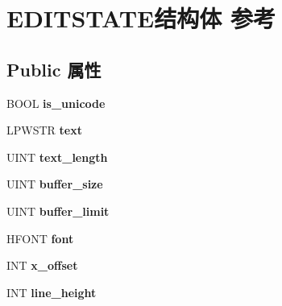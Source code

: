 \hypertarget{struct_e_d_i_t_s_t_a_t_e}{}\section{E\+D\+I\+T\+S\+T\+A\+T\+E结构体 参考}
\label{struct_e_d_i_t_s_t_a_t_e}
\subsection*{Public 属性}
\begin{DoxyCompactItemize}
\item 
\mbox{\label{struct_e_d_i_t_s_t_a_t_e_a9ad0f3fbecdb620628e9606bc6b0d281}} 
B\+O\+OL {\bfseries is\+\_\+unicode}
\item 
\mbox{\label{struct_e_d_i_t_s_t_a_t_e_a28a0fc200c80685fec5c30611979f70a}} 
L\+P\+W\+S\+TR {\bfseries text}
\item 
\mbox{\label{struct_e_d_i_t_s_t_a_t_e_a1a210bb22611295e32802b1051bf5e7e}} 
U\+I\+NT {\bfseries text\+\_\+length}
\item 
\mbox{\label{struct_e_d_i_t_s_t_a_t_e_ace8307276e1ef760902bdc68310f7a1b}} 
U\+I\+NT {\bfseries buffer\+\_\+size}
\item 
\mbox{\label{struct_e_d_i_t_s_t_a_t_e_a1931b9fd9de5e9b723c41b45e2b083ae}} 
U\+I\+NT {\bfseries buffer\+\_\+limit}
\item 
\mbox{\label{struct_e_d_i_t_s_t_a_t_e_a68ee90039532e91424bc48c1db952a8b}} 
H\+F\+O\+NT {\bfseries font}
\item 
\mbox{\label{struct_e_d_i_t_s_t_a_t_e_accf7e9831796bd83d0b99336c161cc44}} 
I\+NT {\bfseries x\+\_\+offset}
\item 
\mbox{\label{struct_e_d_i_t_s_t_a_t_e_ad705b982e62efc3681810042146bb36f}} 
I\+NT {\bfseries line\+\_\+height}
\item 
\mbox{\label{struct_e_d_i_t_s_t_a_t_e_a154bef13494fae871c3ee3ac23c536e6}} 

\end{DoxyCompactItemize}
